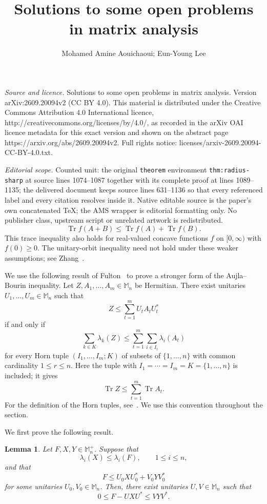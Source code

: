 \documentclass[10pt,a4paper]{amsart}
\numberwithin{equation}{section}
\newtheorem{lemma}[theorem]{Lemma}
\newcommand{\Mn}{\mathbb M_n}
\newcommand{\Mnp}{\mathbb M_n^+}
\newcommand{\Tr}{\operatorname{Tr}}
\begin{document}
\title[Solutions to some open problems in matrix analysis]{Solutions to some open problems in matrix analysis}
\author{Mohamed Amine Aouichaoui; Eun-Young Lee}
\date{}
\maketitle
\noindent\emph{Source and licence.} Solutions to some open problems in matrix analysis. Version arXiv:2609.20094v2 (CC BY 4.0). This material is distributed under the Creative Commons Attribution 4.0 International licence, http://creativecommons.org/licenses/by/4.0/, as recorded in the arXiv OAI licence metadata for this exact version and shown on the abstract page https://arxiv.org/abs/2609.20094v2. Full rights notice: licenses/arxiv-2609.20094-CC-BY-4.0.txt.\par\smallskip
\noindent\textit{Editorial scope.} Counted unit: the original \texttt{theorem} environment \texttt{thm:radius-sharp} at source lines 1074--1087 together with its complete proof at lines 1089--1135; the delivered document keeps source lines 631--1136 so that every referenced label and every citation resolves inside it. Native editable source is the paper's own concatenated TeX; the AMS wrapper is editorial formatting only. No publisher class, upstream script or unrelated artwork is redistributed.
\begin{equation}\label{Rot}
\Tr f(A+B) \le \Tr f(A) + \Tr f(B).
\end{equation}
This trace inequality also holds for real-valued concave
functions $f$ on $[0,\infty)$ with $f(0)\geq0$.
The unitary-orbit inequality need not hold under these weaker
assumptions; see Zhang~\cite{TZhang26b}.

We use the following result of Fulton~\cite{Fulton} to prove
a stronger form of the Aujla--Bourin inequality.
Let $Z,A_1,\ldots,A_m\in\Mn$ be Hermitian.
There exist unitaries $U_1,\ldots,U_m\in\Mn$ such that
\[
 Z\leq\sum_{t=1}^m U_tA_tU_t^*
\]
if and only if
\[
 \sum_{k\in K}\lambda_k(Z)
 \leq
 \sum_{t=1}^m\sum_{i\in I_t}\lambda_i(A_t)
\]
for every Horn tuple $(I_1,\ldots,I_m;K)$ of subsets of
$\{1,\ldots,n\}$ with common cardinality $1\leq r\leq n$.
Here the tuple with
$I_1=\cdots=I_m=K=\{1,\ldots,n\}$ is included; it gives
\[
 \Tr Z\leq\sum_{t=1}^m\Tr A_t.
\]
For the definition of the Horn tuples, see~\cite[Section~2]{Fulton}.
We use this convention throughout the section.

We first prove the following result.

\begin{lemma}\label{lem:completion}
Let \(F,X,Y\in\Mnp\). Suppose that
\[
    \lambda_i(X)\leq\lambda_i(F),
    \qquad 1\leq i\leq n,
\]
and that
\[
    F\leq U_0 X U_0^*+V_0 Y V_0^*
\]
for some unitaries \(U_0,V_0\in\Mn\).
Then, there exist unitaries \(U,V\in\Mn\) such that
\begin{equation}\label{eq:completion}
    0\leq F-UXU^*\leq VYV^*.
\end{equation}
\end{lemma}
\end{document}
